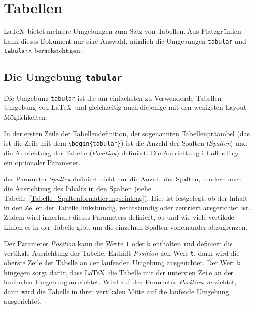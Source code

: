 \documentclass[a4paper,10pt,twoside]{scrbook}
\begin{document}
\chapter{Tabellen}
\label{Kapitel_Tabellen}

\LaTeX\ bietet mehrere Umgebungen zum Satz von Tabellen. Aus Platzgründen kann dieses Dokument nur eine Auswahl, nämlich die Umgebungen \verb!tabular!
und \verb!tabularx! berücksichtigen.



\section{Die Umgebung \texttt{tabular}}

Die Umgebung \verb!tabular! ist 
die am einfachsten zu Verwendende Tabellen-Umgebung von \LaTeX\ und gleichzeitig 
auch diejenige mit den wenigsten Layout-Möglichkeiten. 




In der ersten Zeile der Tabellendefinition, 
der sogenannten Tabellenpräambel 
(das ist die Zeile mit 
dem \verb!\begin{tabular}!) ist die Anzahl der Spalten (\textsl{Spalten}) 
und die Ausrichtung der Tabelle (\textsl{Position}) 
definiert. Die Ausrichtung ist allerdings ein optionaler Parameter.

der Parameter \textsl{Spalten} definiert nicht nur die
Anzahl der Spalten, sondern auch die 
Ausrichtung des Inhalts in den Spalten (siehe 
Tabelle~\ref{Tabelle_Spaltenformatierungseintrag}).
Hier ist festgelegt, ob der Inhalt in den Zellen 
der Tabelle linksbündig, rechtsbündig oder 
zentriert ausgerichtet ist. Zudem wird innerhalb dieses Parameters
definiert, ob und wie viele vertikale Linien es in der Tabelle gibt,
um die einzelnen Spalten voneinander abzugrenzen.



Der Parameter \textsl{Position} 
kann die Werte \verb!t! oder \verb!b!
enthalten und definiert die vertikale 
Ausrichtung der Tabelle. 
Enthält \textsl{Position} den Wert 
\verb!t!, dann wird die oberste Zeile
der Tabelle an der laufenden Umgebung 
ausgerichtet. Der Wert \verb!b!
hingegen sorgt dafür, dass \LaTeX\ die Tabelle 
mit der untersten Zeile an der
laufenden Umgebung ausrichtet. 
Wird auf den Parameter \textsl{Position} 
verzichtet, dann wird die Tabelle in ihrer
vertikalen Mitte auf die laufende 
Umgebung ausgerichtet. 
\end{document}
